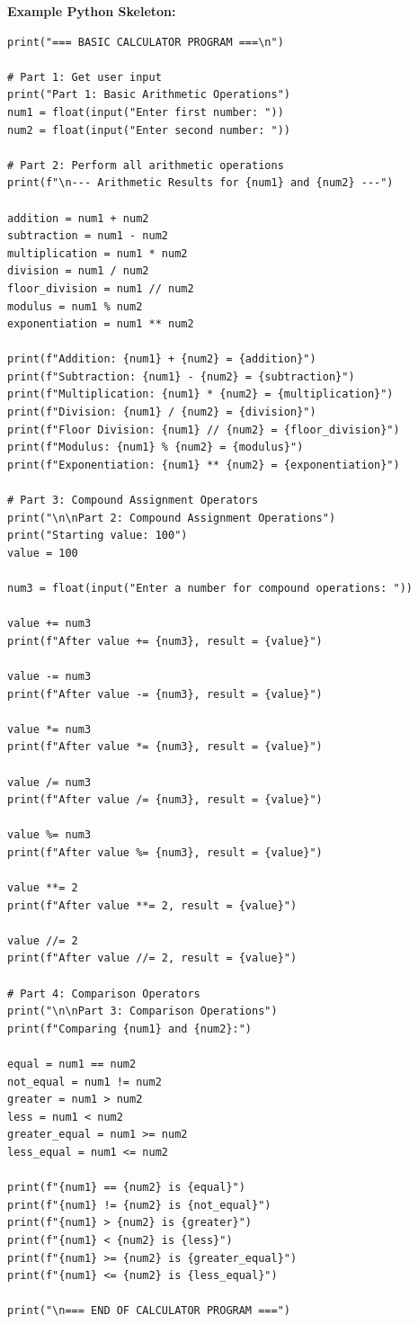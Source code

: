 \documentclass[a4paper,11pt]{article}
\theoremstyle{mytheor}
\begin{document}
    \textbf{Example Python Skeleton:}
    \begin{lstlisting}
print("=== BASIC CALCULATOR PROGRAM ===\n")

# Part 1: Get user input
print("Part 1: Basic Arithmetic Operations")
num1 = float(input("Enter first number: "))
num2 = float(input("Enter second number: "))

# Part 2: Perform all arithmetic operations
print(f"\n--- Arithmetic Results for {num1} and {num2} ---")

addition = num1 + num2
subtraction = num1 - num2
multiplication = num1 * num2
division = num1 / num2
floor_division = num1 // num2
modulus = num1 % num2
exponentiation = num1 ** num2

print(f"Addition: {num1} + {num2} = {addition}")
print(f"Subtraction: {num1} - {num2} = {subtraction}")
print(f"Multiplication: {num1} * {num2} = {multiplication}")
print(f"Division: {num1} / {num2} = {division}")
print(f"Floor Division: {num1} // {num2} = {floor_division}")
print(f"Modulus: {num1} % {num2} = {modulus}")
print(f"Exponentiation: {num1} ** {num2} = {exponentiation}")

# Part 3: Compound Assignment Operators
print("\n\nPart 2: Compound Assignment Operations")
print("Starting value: 100")
value = 100

num3 = float(input("Enter a number for compound operations: "))

value += num3
print(f"After value += {num3}, result = {value}")

value -= num3
print(f"After value -= {num3}, result = {value}")

value *= num3
print(f"After value *= {num3}, result = {value}")

value /= num3
print(f"After value /= {num3}, result = {value}")

value %= num3
print(f"After value %= {num3}, result = {value}")

value **= 2
print(f"After value **= 2, result = {value}")

value //= 2
print(f"After value //= 2, result = {value}")

# Part 4: Comparison Operators
print("\n\nPart 3: Comparison Operations")
print(f"Comparing {num1} and {num2}:")

equal = num1 == num2
not_equal = num1 != num2
greater = num1 > num2
less = num1 < num2
greater_equal = num1 >= num2
less_equal = num1 <= num2

print(f"{num1} == {num2} is {equal}")
print(f"{num1} != {num2} is {not_equal}")
print(f"{num1} > {num2} is {greater}")
print(f"{num1} < {num2} is {less}")
print(f"{num1} >= {num2} is {greater_equal}")
print(f"{num1} <= {num2} is {less_equal}")

print("\n=== END OF CALCULATOR PROGRAM ===")
    \end{lstlisting}
\end{document}
